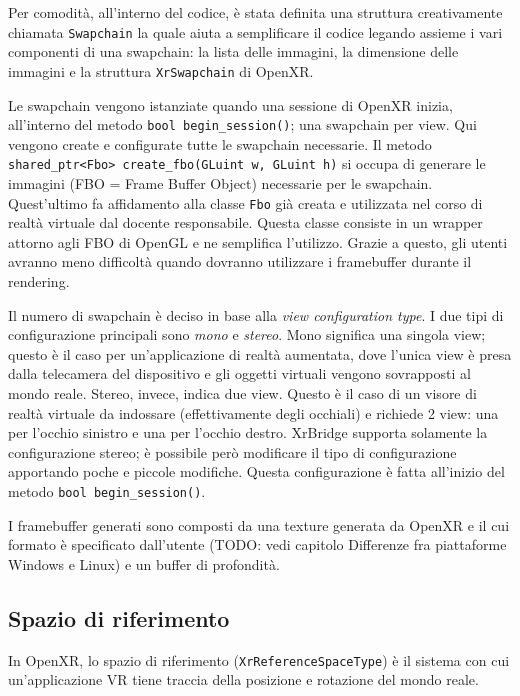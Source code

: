 \documentclass[twoside]{supsistudent}
\begin{document}
Per comodità, all'interno del codice, è stata definita una struttura creativamente chiamata \texttt{Swapchain} la quale aiuta a semplificare il codice legando assieme i vari componenti di una swapchain: la lista delle immagini, la dimensione delle immagini e la struttura \texttt{XrSwapchain} di OpenXR.

Le swapchain vengono istanziate quando una sessione di OpenXR inizia, all'interno del metodo \texttt{bool begin\_session()}; una swapchain per view. Qui vengono create e configurate tutte le swapchain necessarie. Il metodo \texttt{shared\_ptr<Fbo> create\_fbo(GLuint w, GLuint h)} si occupa di generare le immagini (FBO = Frame Buffer Object) necessarie per le swapchain. Quest'ultimo fa affidamento alla classe \texttt{Fbo} già creata e utilizzata nel corso di realtà virtuale dal docente responsabile. Questa classe consiste in un wrapper attorno agli FBO di OpenGL e ne semplifica l'utilizzo. Grazie a questo, gli utenti avranno meno difficoltà quando dovranno utilizzare i framebuffer durante il rendering.

Il numero di swapchain è deciso in base alla \textit{view configuration type}. I due tipi di configurazione principali sono \textit{mono} e \textit{stereo}. Mono significa una singola view; questo è il caso per un'applicazione di realtà aumentata, dove l'unica view è presa dalla telecamera del dispositivo e gli oggetti virtuali vengono sovrapposti al mondo reale. Stereo, invece, indica due view. Questo è il caso di un visore di realtà virtuale da indossare (effettivamente degli occhiali) e richiede 2 view: una per l'occhio sinistro e una per l'occhio destro. XrBridge supporta solamente la configurazione stereo; è possibile però modificare il tipo di configurazione apportando poche e piccole modifiche. Questa configurazione è fatta all'inizio del metodo \texttt{bool begin\_session()}.

I framebuffer generati sono composti da una texture generata da OpenXR e il cui formato è specificato dall'utente (TODO: vedi capitolo Differenze fra piattaforme Windows e Linux) e un buffer di profondità.

\subsection{Spazio di riferimento}

In OpenXR, lo spazio di riferimento (\texttt{XrReferenceSpaceType}) è il sistema con cui un'applicazione VR tiene traccia della posizione e rotazione del mondo reale.
\end{document}

